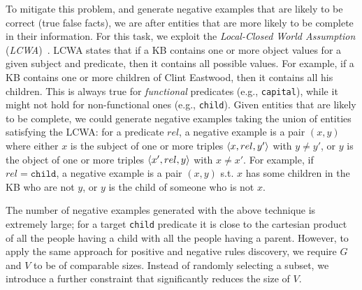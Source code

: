 To mitigate this problem, and generate negative examples that are likely to be correct (true false facts), we are after entities that are more likely to be complete in their information. For this task, we %
exploit the \emph{Local-Closed World Assumption} (\emph{LCWA})~\cite{dong2014data,galarraga2015fast}. LCWA states that if a KB contains one or more object values for a given subject and predicate, then it contains all possible values. For example, if a KB contains one or more children of Clint Eastwood, then it contains all his children. This is always true for \emph{functional} predicates (e.g., \texttt{capital}), 
while it might not hold for non-functional ones (e.g., \texttt{child}). 
Given entities that are likely to be complete, we could generate negative examples taking the union of entities satisfying the LCWA: 
for a predicate $rel$, a negative example is a pair $(x,y)$ where either $x$ is the subject of one or more triples $\langle x,rel,y'\rangle$ with $y \neq y'$, or $y$ is the object of one or more triples $\langle x',rel,y\rangle$ with $x \neq x'$. 
For example, if $rel=\texttt{child}$, a negative example is a pair $(x,y)$ s.t. $x$ has some children in the KB who are not $y$, or $y$ is the child of someone who is not $x$. %

The number of negative examples generated with the above technique is extremely large; for a target \texttt{child} predicate it is close to the cartesian product of all the people having a child with all the people having a parent. 
However, to apply the same approach for positive and negative rules discovery, we require $G$ and $V$ to be of comparable sizes. 
Instead of randomly selecting a subset, we introduce a further constraint that significantly reduces the size of $V$. 

